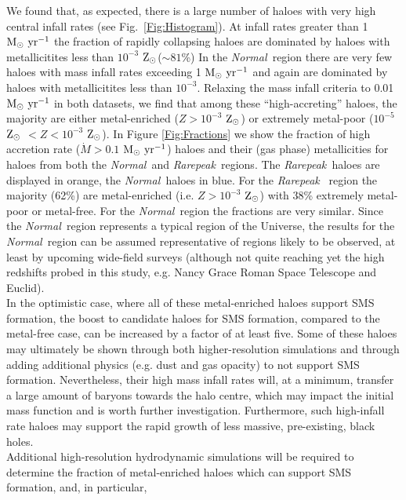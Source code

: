 \documentclass[graphics, twocolumn, usenatbib]{mn2e}
\newcommand{\msolaryr} {$\rm{M_{\odot}~yr^{-1}}~$}
\newcommand{\msolaryrc} {$\rm{M_{\odot}~yr^{-1}}$}
\newcommand{\zsolar} {$\rm{Z_{\odot}}~$}
\newcommand{\zsolarc} {$\rm{Z_{\odot}}$}
\newcommand{\rarepeak} {\textit{Rarepeak~}}
\newcommand{\normal} {\textit{Normal~}}
\begin{document}
\indent We found that, as expected, there is a large number of haloes with
very high central infall rates (see Fig.~\ref{Fig:Histogram}). At infall rates
greater than 1 \msolaryr the fraction of rapidly collapsing haloes are dominated by haloes with
metallicitites less than $10^{-3}$ \zsolarc ($\sim 81$\%)
In the \normal region there are very few haloes with mass
infall rates exceeding 1 \msolaryr and again are dominated by haloes with
metallicitites less than $10^{-3}$. Relaxing the
mass infall criteria to 0.01 \msolaryr in both datasets,
we find that among these ``high-accreting''
haloes, the majority are either metal-enriched ($Z > 10^{-3}$ \zsolarc) or
extremely metal-poor ($10^{-5}$ \zsolar $ < Z < 10^{-3}$ \zsolarc). In Figure \ref{Fig:Fractions}
we show the fraction of high accretion rate ($\dot{M} > 0.1$ \msolaryrc) haloes and
their (gas phase) metallicities for haloes from both the \normal and \rarepeak regions.
The \rarepeak haloes are displayed in orange, the \normal haloes in blue. For the \rarepeak
region the majority (62\%) are metal-enriched (i.e. $Z > 10^{-3}$ \zsolarc) with 38\% extremely
metal-poor or metal-free. For the \normal region the fractions are very similar.
Since the \normal region represents a typical
region of the Universe, the results for the \normal region can be assumed representative of 
regions likely to be observed, at least by upcoming wide-field surveys (although not quite
reaching yet the high redshifts probed in this study, e.g. Nancy Grace Roman Space Telescope and Euclid). \\
\indent In the optimistic case, where all of these metal-enriched haloes support SMS formation, the boost to
candidate haloes for SMS formation, compared to the metal-free case, can be increased by a factor of
at least five. Some of these haloes may ultimately be shown through both  higher-resolution simulations
and through adding additional physics (e.g. dust and gas opacity) 
to not support SMS formation. Nevertheless, their high mass infall rates will, at a minimum, transfer
a large amount of baryons towards the halo centre, which may impact the initial mass function and
is worth further investigation. Furthermore, such high-infall rate haloes may support the rapid
growth of less massive, pre-existing, black holes. \\
\indent Additional high-resolution hydrodynamic simulations will be required to
determine the fraction of metal-enriched haloes which can support SMS formation, and, in particular,
\end{document}
